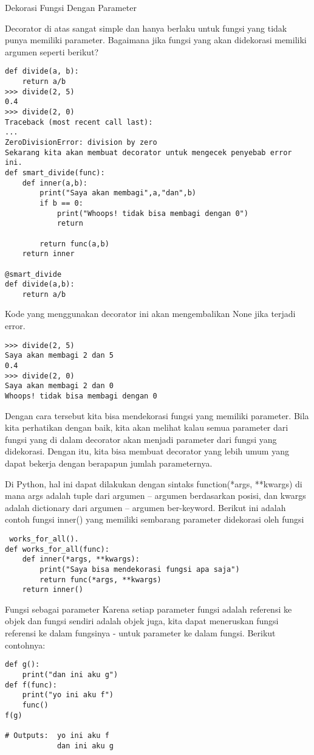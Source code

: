 \documentclass[12pt,a4paper]{article}
\begin{document}
Dekorasi Fungsi Dengan Parameter

Decorator di atas sangat simple dan hanya berlaku untuk fungsi yang tidak punya memiliki parameter. Bagaimana jika fungsi yang akan didekorasi memiliki argumen seperti berikut?
\begin{verbatim}
def divide(a, b):
    return a/b
>>> divide(2, 5)
0.4
>>> divide(2, 0)
Traceback (most recent call last):
...
ZeroDivisionError: division by zero
Sekarang kita akan membuat decorator untuk mengecek penyebab error ini.
def smart_divide(func):
    def inner(a,b):
        print("Saya akan membagi",a,"dan",b)
        if b == 0:
            print("Whoops! tidak bisa membagi dengan 0")
            return

        return func(a,b)
    return inner

@smart_divide
def divide(a,b):
    return a/b
\end{verbatim}

Kode yang menggunakan decorator ini akan mengembalikan None jika terjadi error.
\begin{verbatim}
>>> divide(2, 5)
Saya akan membagi 2 dan 5
0.4
>>> divide(2, 0)
Saya akan membagi 2 dan 0
Whoops! tidak bisa membagi dengan 0
\end{verbatim}

Dengan cara tersebut kita bisa mendekorasi fungsi yang memiliki parameter.
Bila kita perhatikan dengan baik, kita akan melihat kalau semua parameter dari fungsi yang di dalam decorator akan menjadi parameter dari fungsi yang didekorasi. Dengan itu, kita bisa membuat decorator yang lebih umum yang dapat bekerja dengan berapapun jumlah parameternya.

Di Python, hal ini dapat dilakukan dengan sintaks function(*args, **kwargs) di mana args adalah tuple dari argumen – argumen berdasarkan posisi, dan kwargs adalah dictionary dari argumen – argumen ber-keyword.
Berikut ini adalah contoh fungsi inner() yang memiliki sembarang parameter didekorasi oleh fungsi
\begin{verbatim}
 works_for_all().
def works_for_all(func):
    def inner(*args, **kwargs):
        print("Saya bisa mendekorasi fungsi apa saja")
        return func(*args, **kwargs)
    return inner()
\end{verbatim}

Fungsi sebagai parameter
Karena setiap parameter fungsi adalah referensi ke objek dan fungsi sendiri adalah objek juga, kita dapat meneruskan fungsi referensi ke dalam fungsinya - untuk parameter ke dalam fungsi.
Berikut contohnya: 
\begin{verbatim}
def g():
    print("dan ini aku g")
def f(func):
    print("yo ini aku f")
    func() 
f(g)

# Outputs: 	yo ini aku f
			dan ini aku g
\end{verbatim}
\end{document}
